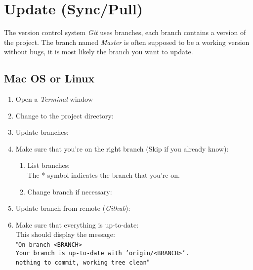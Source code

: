 \section{Update (Sync/Pull)} \label{oppdatere}

The version control system \textit{Git} uses branches, each branch contains a version of the project. The branch named \textit{Master} is often supposed to be a working version without bugs, it is most likely the branch you want to update. 
\subsection{Mac OS or Linux}
\begin{enumerate}
    \item Open a \textit{Terminal} window
    \item Change to the project directory:
    \item Update branches:
    \item  Make sure that you're on the right branch (Skip if you already know):
    \begin{enumerate}
        \item List branches:
         \\
        The * symbol indicates the branch that you're on.  
        \item Change branch if necessary:
    \end{enumerate}
    \item Update branch from remote (\textit{Github}):
    \item Make sure that everything is up-to-date:
    \\
    This should display the message: \\
    "\texttt{On branch <BRANCH>\\
    Your branch is up-to-date with 'origin/<BRANCH>'.\\
    nothing to commit, working tree clean}"
    
\end{enumerate}

